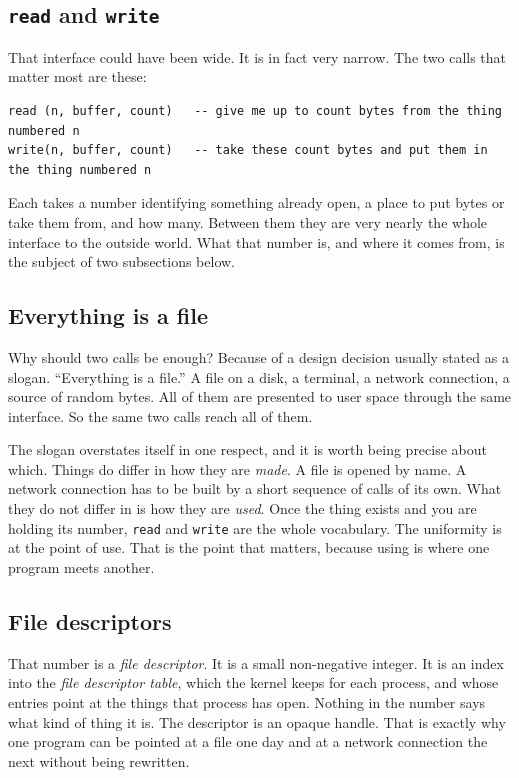 \documentclass[11pt,a4paper]{article}
\begin{document}
\subsection{\texttt{read} and \texttt{write}}

That interface could have been wide. It is in fact very narrow. The two calls that matter most
are these:

\begin{lstlisting}[language=SH]
read (n, buffer, count)   -- give me up to count bytes from the thing numbered n
write(n, buffer, count)   -- take these count bytes and put them in the thing numbered n
\end{lstlisting}

Each takes a number identifying something already open, a place to put bytes or take them from,
and how many. Between them they are very nearly the whole interface to the outside world. What that
number is, and where it comes from, is the subject of two subsections below.

\subsection{Everything is a file}

Why should two calls be enough? Because of a design decision usually stated as a slogan.
``Everything is a file.'' A file on a disk, a terminal, a network connection, a source of
random bytes. All of them are presented to user space through the same interface. So the same two
calls reach all of them.

The slogan overstates itself in one respect, and it is worth being precise about which. Things do
differ in how they are \emph{made}. A file is opened by name. A network connection has to be built
by a short sequence of calls of its own. What they do not differ in is how they are \emph{used}.
Once the thing exists and you are holding its number, \texttt{read} and \texttt{write} are the whole
vocabulary. The uniformity is at the point of use. That is the point that matters, because using is
where one program meets another.

\subsection{File descriptors}

That number is a \emph{file descriptor}. It is a small non-negative integer. It is an index into the
\emph{file descriptor table}, which the kernel keeps for each process, and whose entries point at
the things that process has open.
Nothing in the number says what kind of thing it is. The descriptor is an opaque handle. That is
exactly why one program can be pointed at a file one day and at a network connection the next
without being rewritten.
\end{document}
